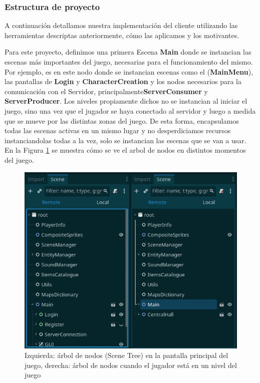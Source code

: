 \subsubsection{Estructura de proyecto}

\noindent A continuación detallamos nuestra implementación del cliente utilizando las herramientas descriptas
anteriormente, cómo las aplicamos y los motivantes.

Para este proyecto, definimos una primera Escena \textbf{Main} donde se instancian las escenas más importantes 
del juego, necesarias para el funcionamiento del mismo. Por ejemplo, es en este nodo donde se instancian
escenas como el (\textbf{MainMenu}), las pantallas de \textbf{Login} y \textbf{CharacterCreation}
y los nodos necesarios para la comunicación con el Servidor, principalmente\textbf{ServerConsumer}
y \textbf{ServerProducer}.
Los niveles propiamente dichos no se instancian al iniciar el juego, sino una vez que el jugador 
se haya conectado al servidor y luego a medida que se mueve por las distintas zonas del juego.
De esta forma, encapsulamos todas las escenas activas en un mismo lugar y 
no desperdiciamos recursos instanciandolas todas a la vez, solo se instancian las escenas que
se van a usar. En la Figura \ref{fig:godot-node-tree} se muestra
cómo se ve el arbol de nodos en distintos momentos del juego.

\begin{figure}[htbp]
    \centering
    \includegraphics[width=1.0\textwidth]{../assets/godot-scene-tree.png}
    \caption{Izquierda: árbol de nodos (Scene Tree) en la pantalla principal del juego,
             derecha: árbol de nodos cuando el jugador está en un nivel del juego}
    \label{fig:godot-node-tree}
\end{figure}


